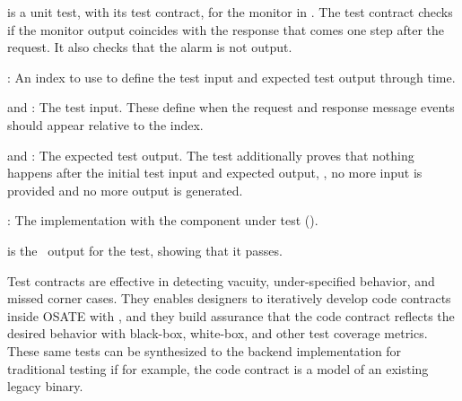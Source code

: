  is a unit test, with its test contract, for the monitor in .
The test contract checks if the monitor output coincides with the response that comes one step after the request.
It also checks that the alarm is not output.
\begin{compactitem}
\item {}: An index to use to define the test input and expected test output through time.
\item {} and : The test input. These define when the request and response message events should appear relative to the index.
\item {} and : The expected test output. 
The test additionally proves that nothing happens after the initial test input and expected output, \ie, no more input is provided and no more output is generated.
\item {}: The implementation with the component under test ().
\end{compactitem}
 is the \agr\ output for the test, showing that it passes. 

Test contracts are effective in detecting vacuity, under-specified behavior, and missed corner cases.
They enables designers to iteratively develop code contracts inside OSATE with \agr, and they build assurance that the code contract reflects the desired behavior with black-box, white-box, and other test coverage metrics.
These same tests can be synthesized to the backend implementation for traditional testing if for example, the code contract is a model of an existing legacy binary.